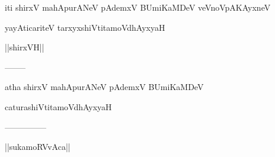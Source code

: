 \documentclass{article}
\begin{document}
\begin{center}
iti shirxV mahApurANeV pAdemxV BUmiKaMDeV veVnoVpAKAyxneV
\end{center}

\begin{center}
yayAticariteV tarxyxshiVtitamoVdhAyxyaH
\end{center}

\begin{center}
||shirxVH||
\end{center}

\begin{center}
--------
\end{center}

\begin{center}
atha shirxV mahApurANeV pAdemxV BUmiKaMDeV
\end{center}

\begin{center}
caturashiVtitamoVdhAyxyaH
\end{center}

\begin{center}

---------------
\end{center}

\begin{center}
||sukamoRVvAca||
\end{center}
\end{document}
